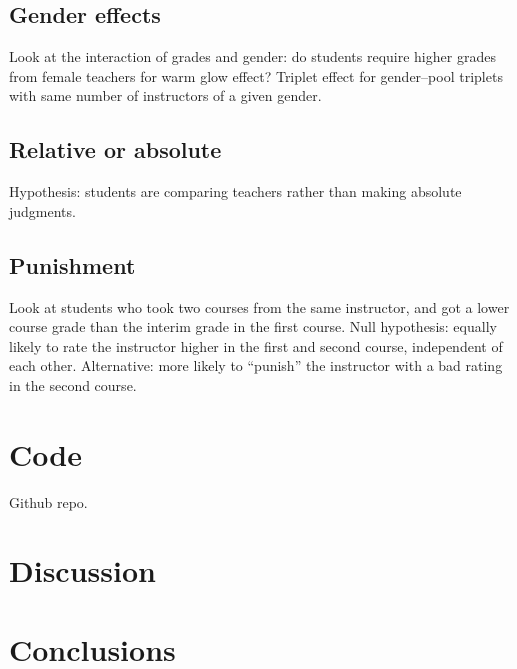 \documentclass[12pt]{article}
\begin{document}
\subsection{Gender effects}
Look at the interaction of grades and gender: 
do students require higher grades from female teachers for warm glow effect?
Triplet effect for gender--pool triplets with same number of instructors of a given gender.

\subsection{Relative or absolute}
Hypothesis: students are comparing teachers rather than making absolute judgments.

\subsection{Punishment}
Look at students who took two courses from the same instructor, and got a lower course grade than the interim grade in the first course.
Null hypothesis: equally likely to rate the instructor higher in the first and second course, 
independent of each other.
Alternative: more likely to ``punish'' the instructor with a bad rating in the second course.


\section{Code}
Github repo.

\section{Discussion}

\section{Conclusions}
\end{document}
